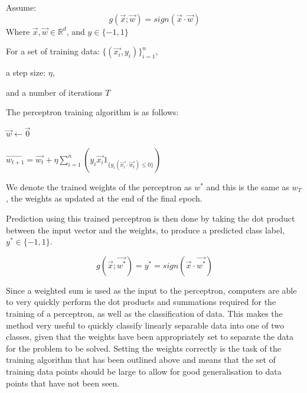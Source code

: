 \documentclass[10pt,twocolumn,a4paper]{article}
\begin{document}
Assume:
\[ g(\vec{x}; \vec{w}) = sign(\vec{x} \cdot \vec{w}) \]
Where $ \vec{x},\vec{w} \in \mathbb{R}^d $, and $y \in \{-1, 1\} $

For a set of training data: $ \{(\vec{x_i}, y_i)\}_{i=1}^n $,

a step size: $\eta$,

and a number of iterations $T$

The perceptron training algorithm is as follows:
\begin{algorithmic}
\State $\vec{w} \gets \vec{0}$

    $\vec{w_{t+1}} = \vec{w_t} + \eta \sum_{i=1}^n(y_i \vec{x_i} 1_{\{ y_i (\vec{x_i} \cdot \vec{w_t}  ) \leq 0 \}})$
\EndFor
\end{algorithmic}

We denote the trained weights of the perceptron as $w^*$ and this is the same as $w_T$, the weights as updated at the end of the final epoch.

Prediction using this trained perceptron is then done by taking the dot product between the input vector and the weights, to produce a predicted class label, $y^* \in \{-1, 1\}$.

\[ g(\vec{x}; \vec{w^*}) = y^* = sign(\vec{x} \cdot \vec{w^*} ) \]

Since a weighted sum is used as the input to the perceptron, computers are able to very quickly perform the dot products and summations required for the training of a perceptron, as well as the classification of data. This makes the method very useful to quickly classify linearly separable data into one of two classes, given that the weights have been appropriately set to separate the data for the problem to be solved. Setting the weights correctly is the task of the training algorithm that has been outlined above and means that the set of training data points should be large to allow for good generalisation to data points that have not been seen.
\end{document}
